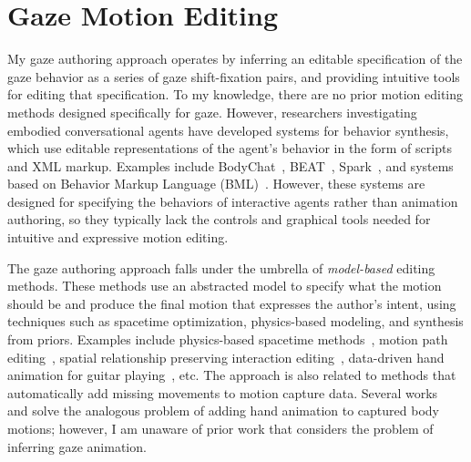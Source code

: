 \section{Gaze Motion Editing}

My gaze authoring approach operates by inferring an editable specification of the gaze behavior as a series of gaze shift-fixation pairs, and providing intuitive tools for editing that specification. To my knowledge, there are no prior motion editing methods designed specifically for gaze. However, researchers investigating embodied conversational agents have developed systems for behavior synthesis, which use editable representations of the agent's behavior in the form of scripts and XML markup. Examples include BodyChat~\cite{vilhjalmsson1998bodychat}, BEAT~\cite{cassell1999fully}, Spark~\cite{vilhjalmsson2004animating}, and systems based on Behavior Markup Language (BML)~\cite{vilhjalmsson2007bml}. However, these systems are designed for specifying the behaviors of interactive agents rather than animation authoring, so they typically lack the controls and graphical tools needed for intuitive and expressive motion editing.

The gaze authoring approach falls under the umbrella of \emph{model-based} editing methods. These methods use an abstracted model to specify what the motion should be and produce the final motion that expresses the author's intent, using techniques such as spacetime optimization, physics-based modeling, and synthesis from priors. Examples include physics-based spacetime methods~\cite{popovic99physically}, motion path editing~\cite{gleicher2001path}, spatial relationship preserving interaction editing~\cite{ho2010spatial}, data-driven hand animation for guitar playing~\cite{elkoura2003handrix}, etc.
The approach is also related to methods that automatically add missing movements to motion capture data. Several works~\cite{jorg2012finger} and \cite{ye2012hand} solve the analogous problem of adding hand animation to captured body motions; however, I am unaware of prior work that considers the problem of inferring gaze animation.
